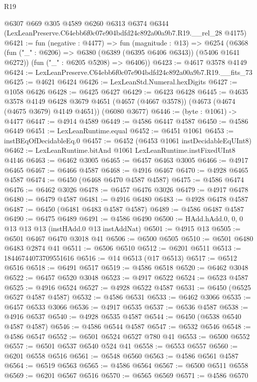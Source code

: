 \begin{lexlean}{R19}
\begin{coremodule}
    @6307
    @669
    @305
    @4589
    @6260
    @6313
    @6374
    @6344
    (LexLeanPreserve.C64ebb6f0c07e904bdfd24c892a00a9b7.R19.__rel_28 @4175)
@6421 := fun (negative : @4477) =>
  fun (magnitude : @13) =>
  @6254
    (@6368
      (fun ("_" : @6206) => @6380 (@6389 (@6395 @6406 @6343)) (@5406 @1641 @6272))
      (fun ("_" : @6205 @5208) => @6406))
@6423 := @4617 @3578 @4149
@6424 := LexLeanPreserve.C64ebb6f0c07e904bdfd24c892a00a9b7.R19.__fits_73
@6425 := @4621 @6424
@6426 := LexLeanStd.Numeral.hexDigits
@6427 := @1058 @6426
@6428 := @6425 @6427
@6429 := @6423 @6428
@6445 := @4635
    @3578
    @4149
    @6428
    @3679
    @4651
    (@4657 (@4667 @3578))
    (@4673 (@4674 (@4675 @3679) @4149 @4651))
    (@6080 @3677)
@6446 := (byte : @1061) -> @4477
@6447 := @4914 @4589
@6449 := @4586 @6447 @4587
@6450 := @4586 @6449
@6451 := LexLeanRuntime.equal
@6452 := @6451 @1061
@6453 := instBEqOfDecidableEq.{0}
@6457 := @6452 (@6453 @1061 instDecidableEqUInt8)
@6462 := LexLeanRuntime.bitAnd @1061 LexLeanRuntime.instFixedUInt8 @4146
@6463 := @6462 @3005
@6465 := @6457 @6463 @3005
@6466 := @4917 @6465
@6467 := @6466 @4587
@6468 := @4916 @6467
@6470 := @4928 @6465 @4587
@6474 := @6450 (@6468 @6470 @4587 @4587)
@6475 := @4586 @6474
@6476 := @6462 @3026
@6478 := @6457 @6476 @3026
@6479 := @4917 @6478
@6480 := @6479 @4587
@6481 := @4916 @6480
@6483 := @4928 @6478 @4587
@6487 := @6450 (@6481 @6483 @4587 @4587)
@6489 := @4586 @6487 @4587
@6490 := @6475 @6489
@6491 := @4586 @6490
@6500 := HAdd.hAdd.{0, 0, 0} @13 @13 @13 (instHAdd.{0} @13 instAddNat)
@6501 := @4915 @13
@6505 := @6501 @6467 @6470 @3018 @41
@6506 := @6500 @6505
@6510 := @6501 @6480 @6483 @2874 @41
@6511 := @6506 @6510
@6512 := @6201 @6511
@6513 := 18446744073709551616
@6516 := @14 @6513 (@17 @6513)
@6517 := @6512 @6516
@6518 := @6491 @6517
@6519 := @4586 @6518
@6520 := @6462 @3048
@6522 := @6457 @6520 @3048
@6523 := @4917 @6522
@6524 := @6523 @4587
@6525 := @4916 @6524
@6527 := @4928 @6522 @4587
@6531 := @6450 (@6525 @6527 @4587 @4587)
@6532 := @4586 @6531
@6533 := @6462 @3066
@6535 := @6457 @6533 @3066
@6536 := @4917 @6535
@6537 := @6536 @4587
@6538 := @4916 @6537
@6540 := @4928 @6535 @4587
@6544 := @6450 (@6538 @6540 @4587 @4587)
@6546 := @4586 @6544 @4587
@6547 := @6532 @6546
@6548 := @4586 @6547
@6552 := @6501 @6524 @6527 @780 @41
@6553 := @6500 @6552
@6557 := @6501 @6537 @6540 @524 @41
@6558 := @6553 @6557
@6560 := @6201 @6558 @6516
@6561 := @6548 @6560
@6563 := @4586 @6561 @4587
@6564 := @6519 @6563
@6565 := @4586 @6564
@6567 := @6500 @6511 @6558
@6569 := @6201 @6567 @6516
@6570 := @6565 @6569
@6571 := @4586 @6570

\end{coremodule}
\end{lexlean}
